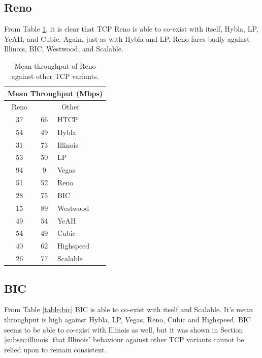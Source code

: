 \documentclass[11pt,a4paper,twocolumn]{article}
\begin{document}
\subsection{Reno}
\label{subsec:reno}
From Table \ref{table:reno}, it is clear that TCP Reno is able to co-exist with itself, Hybla, LP, YeAH, and Cubic.
Again, just as with Hybla and LP, Reno fares badly against Illinois, BIC, Westwood, and Scalable.

\begin{table}[h!]
	\begin{center}
		\begin{tabular}{| c | c | l |}
    			\hline
			\multicolumn{3}{|c|}{Mean Throughput (Mbps)} \\
    			\hline
    			Reno &  \multicolumn{2}{|c|}{Other}  \\
			\hline
    			37 & 66 & HTCP \\
			\hline
    			54 & 49 & Hybla \\
			\hline
    			31 & 73 & Illinois \\
			\hline
    			53 & 50 & LP \\
			\hline
    			94 & 9 & Vegas \\
			\hline
    			51 & 52 & Reno \\
			\hline
    			28 & 75 & BIC \\
			\hline
    			15 & 89 & Westwood \\
			\hline
    			49 & 54 & YeAH \\
			\hline
    			54 & 49 & Cubic \\
			\hline
    			40 & 62 & Highspeed \\
			\hline
    			26 & 77 & Scalable \\
    			\hline
    		\end{tabular}
  	\end{center}
  	\caption{Mean throughput of Reno against other TCP variants.}
	\label{table:reno}
\end{table}

\subsection{BIC}
\label{subsec:bic}

From Table \ref{table:bic} BIC is able to co-exist with itself and Scalable. It's mean throughput is high
against Hybla, LP, Vegas, Reno, Cubic and Highspeed. BIC seems to be able to co-exist with Illinois as well,
but it was shown in Section \ref{subsec:illinois} that Illinois' behaviour against other TCP variants cannot be relied upon to remain consistent.
\end{document}

